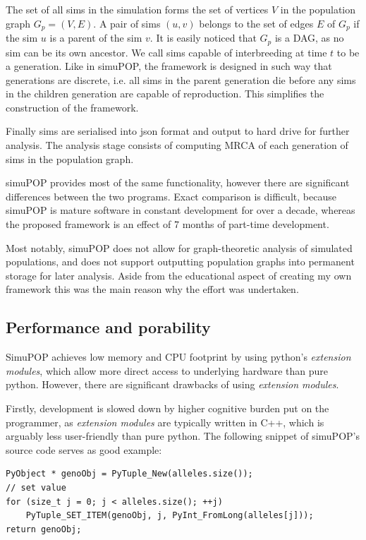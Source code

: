 \documentclass{l4proj}
\begin{document}
The set of all sims in the simulation forms the set of vertices $V$ in the \gls{population graph} $G_{p} = (V, E)$. A pair of sims $(u, v)$ belongs to the set of edges $E$ of $G_{p}$ if the sim $u$ is a parent of the sim $v$. It is easily noticed that $G_{p}$ is a DAG, as no sim can be its own ancestor. We call sims capable of interbreeding at time $t$ to be a generation. Like in simuPOP, the framework is designed in such way that generations are discrete, i.e. all sims in the parent generation die before any sims in the children generation are capable of reproduction. This simplifies the construction of the framework.

Finally sims are serialised into json format and output to hard drive for further analysis. The analysis stage consists of computing MRCA of each generation of sims in the population graph.

simuPOP provides most of the same functionality, however there are significant differences between the two programs. Exact comparison is difficult, because simuPOP is mature software in constant development for over a decade, whereas the proposed framework is an effect of 7 months of part-time development.

Most notably, simuPOP does not allow for graph-theoretic analysis of simulated populations, and does not support outputting population graphs into permanent storage for later analysis. Aside from the educational aspect of creating my own framework this was the main reason why the effort was undertaken.

\subsection{Performance and porability}

SimuPOP achieves low memory and CPU footprint by using python's \textit{extension modules}, which allow more direct access to underlying hardware than pure python. However, there are significant drawbacks of using \textit{extension modules}.

Firstly, development is slowed down by higher cognitive burden put on the programmer, as \textit{extension modules} are typically written in C++, which is arguably less user-friendly than pure python. The following snippet of simuPOP's source code serves as good example:

\begin{lstlisting}
PyObject * genoObj = PyTuple_New(alleles.size());
// set value
for (size_t j = 0; j < alleles.size(); ++j)
    PyTuple_SET_ITEM(genoObj, j, PyInt_FromLong(alleles[j]));
return genoObj;
\end{lstlisting}
\end{document}
